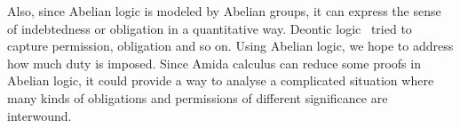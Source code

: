 Also, since Abelian logic is modeled by Abelian groups, it can express the
sense of indebtedness or obligation in a quantitative way.
Deontic logic~\citep{von1951deontic,sep-logic-deontic} tried to capture permission,
obligation and so on.
Using Abelian logic, we hope to address how much duty is imposed.
Since Amida calculus can reduce some proofs in Abelian logic, it could
provide a way to analyse a complicated situation where many kinds of
obligations and permissions of different significance are interwound.
